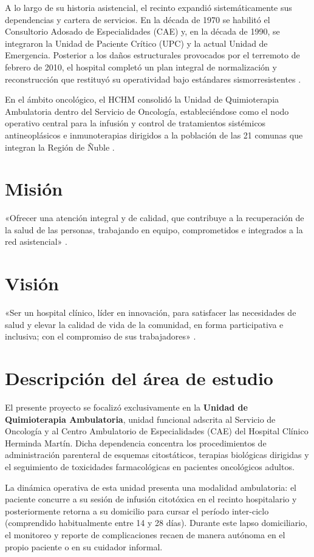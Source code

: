 A lo largo de su historia asistencial, el recinto expandió sistemáticamente sus dependencias y cartera de servicios. En la década de 1970 se habilitó el Consultorio Adosado de Especialidades (CAE) y, en la década de 1990, se integraron la Unidad de Paciente Crítico (UPC) y la actual Unidad de Emergencia. Posterior a los daños estructurales provocados por el terremoto de febrero de 2010, el hospital completó un plan integral de normalización y reconstrucción que restituyó su operatividad bajo estándares sismorresistentes \parencite{hchm2024web}.

En el ámbito oncológico, el HCHM consolidó la Unidad de Quimioterapia Ambulatoria dentro del Servicio de Oncología, estableciéndose como el nodo operativo central para la infusión y control de tratamientos sistémicos antineoplásicos e inmunoterapias dirigidos a la población de las 21 comunas que integran la Región de Ñuble \parencite{minsal2022plancancer}.

\section*{Misión}
«Ofrecer una atención integral y de calidad, que contribuye a la recuperación de la salud de las personas, trabajando en equipo, comprometidos e integrados a la red asistencial» \parencite{hchm2024web}.

\section*{Visión}
«Ser un hospital clínico, líder en innovación, para satisfacer las necesidades de salud y elevar la calidad de vida de la comunidad, en forma participativa e inclusiva; con el compromiso de sus trabajadores» \parencite{hchm2024web}.

\section*{Descripción del área de estudio}
El presente proyecto se focalizó exclusivamente en la \textbf{Unidad de Quimioterapia Ambulatoria}, unidad funcional adscrita al Servicio de Oncología y al Centro Ambulatorio de Especialidades (CAE) del Hospital Clínico Herminda Martín. Dicha dependencia concentra los procedimientos de administración parenteral de esquemas citostáticos, terapias biológicas dirigidas y el seguimiento de toxicidades farmacológicas en pacientes oncológicos adultos.

La dinámica operativa de esta unidad presenta una modalidad ambulatoria: el paciente concurre a su sesión de infusión citotóxica en el recinto hospitalario y posteriormente retorna a su domicilio para cursar el período inter-ciclo (comprendido habitualmente entre 14 y 28 días). Durante este lapso domiciliario, el monitoreo y reporte de complicaciones recaen de manera autónoma en el propio paciente o en su cuidador informal.

